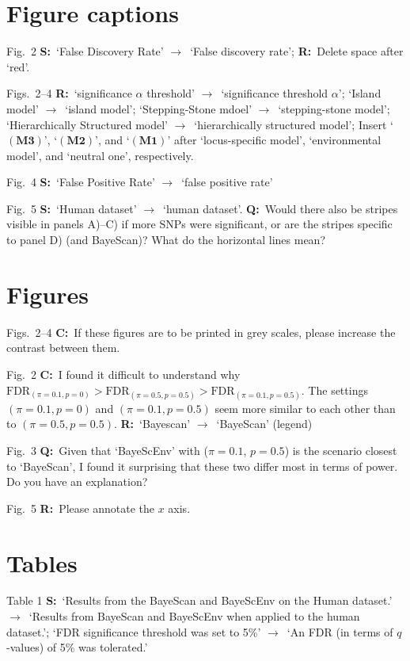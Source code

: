 \documentclass[11pt]{article}
\newenvironment{my_description}
{\begin{description}
  \setlength{\itemsep}{2pt}
  \setlength{\parskip}{0pt}
  \setlength{\parsep}{0pt}}
{\end{description}}
\newcommand{\ra}{$\rightarrow$\ }
\newcommand{\C}{\textbf{C:}\ }
\newcommand{\Q}{\textbf{Q:}\ }
\newcommand{\R}{\textbf{R:}\ }
\newcommand{\V}{\textbf{S:}\ }
\begin{document}
\section{Figure captions}
\begin{my_description}
	\item[Fig.\ 2] \V `False Discovery Rate' \ra `False discovery rate'; \R Delete space after `red'.
	\item[Figs.\ 2--4]\R `significance $\alpha$ threshold' \ra `significance threshold $\alpha$'; `Island model' \ra `island model'; `Stepping-Stone mdoel' \ra `stepping-stone model'; `Hierarchically Structured model' \ra `hierarchically structured model'; Insert `$\mathbf{(M3)}$', `$\mathbf{(M2)}$', and `$\mathbf{(M1)}$' after `locus-specific model', `environmental model', and `neutral one', respectively.
	\item[Fig.\ 4] \V `False Positive Rate' \ra `false positive rate'
	\item[Fig.\ 5] \V `Human dataset' \ra `human dataset'. \Q Would there also be stripes visible in panels A)--C) if more SNPs were significant, or are the stripes specific to panel D) (and BayeScan)? What do the horizontal lines mean?
	
\end{my_description}

\section{Figures}
\begin{my_description}
	\item[Figs.\ 2--4] \C If these figures are to be printed in grey scales, please increase the contrast between them.
	\item[Fig.\ 2] \C I found it difficult to understand why $\mathrm{FDR}_{(\pi = 0.1, p = 0)} > \mathrm{FDR}_{(\pi = 0.5, p = 0.5)} > \mathrm{FDR}_{(\pi = 0.1, p = 0.5)}$. The settings $(\pi = 0.1, p = 0)$ and $(\pi = 0.1, p = 0.5)$ seem more similar to each other than to $(\pi = 0.5, p = 0.5)$. \R `Bayescan' \ra `BayeScan' (legend)
	\item[Fig.\ 3] \Q Given that `BayeScEnv' with ($\pi = 0.1$, $p = 0.5$) is the scenario closest to `BayeScan', I found it surprising that these two differ most in terms of power. Do you have an explanation?
	\item[Fig.\ 5] \R Please annotate the $x$ axis.
\end{my_description}

\section{Tables}
\begin{my_description}
	\item[Table 1] \V `Results from the BayeScan and BayeScEnv on the Human dataset.' \ra `Results from BayeScan and BayeScEnv when applied to the human dataset.'; `FDR significance threshold was set to 5\%' \ra `An FDR (in terms of $q$-values) of 5\% was tolerated.'
\end{my_description}
\end{document}
